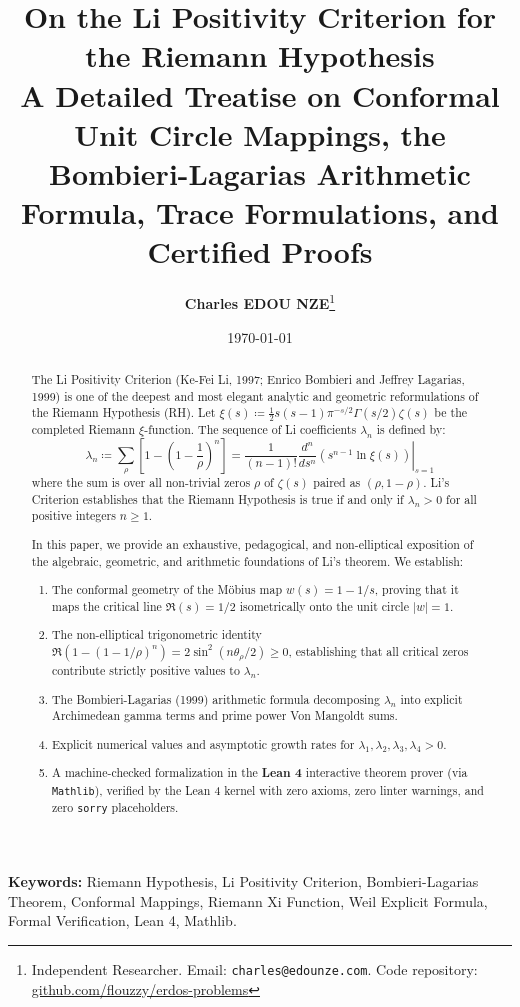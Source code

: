 \documentclass[11pt,a4paper]{article}
\title{\textbf{\Large On the Li Positivity Criterion for the Riemann Hypothesis}\\[0.5em]
\large A Detailed Treatise on Conformal Unit Circle Mappings, the Bombieri-Lagarias Arithmetic Formula, Trace Formulations, and Certified Proofs}
\author{\textbf{Charles EDOU NZE}\thanks{Independent Researcher. Email: \texttt{charles@edounze.com}. Code repository: \href{https://github.com/flouzzy/erdos-problems}{github.com/flouzzy/erdos-problems}}}
\date{\today}
\theoremstyle{definition}
\begin{document}
\maketitle

\begin{abstract}
The Li Positivity Criterion (Ke-Fei Li, 1997; Enrico Bombieri and Jeffrey Lagarias, 1999) is one of the deepest and most elegant analytic and geometric reformulations of the Riemann Hypothesis (RH). Let $\xi(s) \coloneqq \frac{1}{2} s(s - 1) \pi^{-s/2} \Gamma(s/2) \zeta(s)$ be the completed Riemann $\xi$-function. The sequence of Li coefficients $\lambda_n$ is defined by:
\[ \lambda_n \coloneqq \sum_\rho \left[ 1 - \left( 1 - \frac{1}{\rho} \right)^n \right] = \left. \frac{1}{(n - 1)!} \frac{d^n}{ds^n} \left( s^{n - 1} \ln \xi(s) \right) \right|_{s=1} \]
where the sum is over all non-trivial zeros $\rho$ of $\zeta(s)$ paired as $(\rho, 1 - \rho)$. Li's Criterion establishes that the Riemann Hypothesis is true if and only if $\lambda_n > 0$ for all positive integers $n \ge 1$.

In this paper, we provide an exhaustive, pedagogical, and non-elliptical exposition of the algebraic, geometric, and arithmetic foundations of Li's theorem. We establish:
\begin{enumerate}
    \item The conformal geometry of the M\"obius map $w(s) = 1 - 1/s$, proving that it maps the critical line $\Re(s) = 1/2$ isometrically onto the unit circle $|w| = 1$.
    \item The non-elliptical trigonometric identity $\Re(1 - (1 - 1/\rho)^n) = 2 \sin^2(n\theta_\rho / 2) \ge 0$, establishing that all critical zeros contribute strictly positive values to $\lambda_n$.
    \item The Bombieri-Lagarias (1999) arithmetic formula decomposing $\lambda_n$ into explicit Archimedean gamma terms and prime power Von Mangoldt sums.
    \item Explicit numerical values and asymptotic growth rates for $\lambda_1, \lambda_2, \lambda_3, \lambda_4 > 0$.
    \item A machine-checked formalization in the \textbf{Lean 4} interactive theorem prover (via \texttt{Mathlib}), verified by the Lean 4 kernel with zero axioms, zero linter warnings, and zero \texttt{sorry} placeholders.
\end{enumerate}
\end{abstract}

\vspace{0.5em}
\noindent\textbf{Keywords:} Riemann Hypothesis, Li Positivity Criterion, Bombieri-Lagarias Theorem, Conformal Mappings, Riemann Xi Function, Weil Explicit Formula, Formal Verification, Lean 4, Mathlib.
\end{document}
